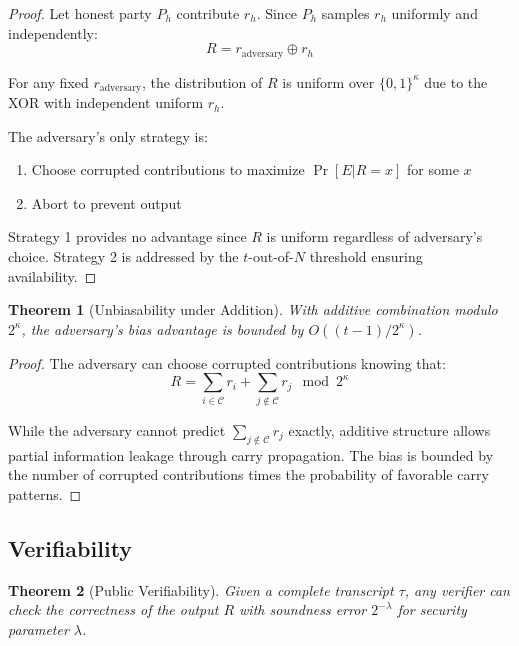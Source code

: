 \documentclass[11pt,a4paper]{article}
\newtheorem{theorem}{Theorem}[section]
\begin{document}
\begin{proof}
Let honest party $P_h$ contribute $r_h$. Since $P_h$ samples $r_h$ uniformly and independently:
\begin{equation}
R = r_{\text{adversary}} \oplus r_h
\end{equation}

For any fixed $r_{\text{adversary}}$, the distribution of $R$ is uniform over $\{0,1\}^{\kappa}$ due to the XOR with independent uniform $r_h$.

The adversary's only strategy is:
\begin{enumerate}
    \item Choose corrupted contributions to maximize $\Pr[E | R = x]$ for some $x$
    \item Abort to prevent output
\end{enumerate}

Strategy 1 provides no advantage since $R$ is uniform regardless of adversary's choice. Strategy 2 is addressed by the $t$-out-of-$N$ threshold ensuring availability.
\end{proof}

\begin{theorem}[Unbiasability under Addition]
With additive combination modulo $2^{\kappa}$, the adversary's bias advantage is bounded by $O((t-1) / 2^{\kappa})$.
\end{theorem}

\begin{proof}
The adversary can choose corrupted contributions knowing that:
\begin{equation}
R = \sum_{i \in \mathcal{C}} r_i + \sum_{j \notin \mathcal{C}} r_j \mod 2^{\kappa}
\end{equation}

While the adversary cannot predict $\sum_{j \notin \mathcal{C}} r_j$ exactly, additive structure allows partial information leakage through carry propagation. The bias is bounded by the number of corrupted contributions times the probability of favorable carry patterns.
\end{proof}

\subsection{Verifiability}

\begin{theorem}[Public Verifiability]
Given a complete transcript $\tau$, any verifier can check the correctness of the output $R$ with soundness error $2^{-\lambda}$ for security parameter $\lambda$.
\end{theorem}
\end{document}
